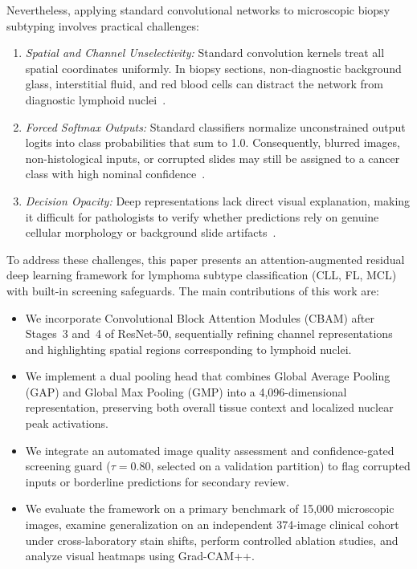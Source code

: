 \documentclass[conference]{IEEEtran}
\begin{document}
Nevertheless, applying standard convolutional networks to microscopic biopsy subtyping involves practical challenges:
\begin{enumerate}
    \item \textit{Spatial and Channel Unselectivity:} Standard convolution kernels treat all spatial coordinates uniformly. In biopsy sections, non-diagnostic background glass, interstitial fluid, and red blood cells can distract the network from diagnostic lymphoid nuclei~\cite{raman2025deep}.
    \item \textit{Forced Softmax Outputs:} Standard classifiers normalize unconstrained output logits into class probabilities that sum to 1.0. Consequently, blurred images, non-histological inputs, or corrupted slides may still be assigned to a cancer class with high nominal confidence~\cite{singh2023enhanced}.
    \item \textit{Decision Opacity:} Deep representations lack direct visual explanation, making it difficult for pathologists to verify whether predictions rely on genuine cellular morphology or background slide artifacts~\cite{alsadi2023enhanced, chattopadhay2018grad}.
\end{enumerate}

To address these challenges, this paper presents an attention-augmented residual deep learning framework for lymphoma subtype classification (CLL, FL, MCL) with built-in screening safeguards. The main contributions of this work are:
\begin{itemize}
    \item We incorporate Convolutional Block Attention Modules (CBAM) after Stages~3 and~4 of ResNet-50, sequentially refining channel representations and highlighting spatial regions corresponding to lymphoid nuclei.
    \item We implement a dual pooling head that combines Global Average Pooling (GAP) and Global Max Pooling (GMP) into a 4,096-dimensional representation, preserving both overall tissue context and localized nuclear peak activations.
    \item We integrate an automated image quality assessment and confidence-gated screening guard ($\tau = 0.80$, selected on a validation partition) to flag corrupted inputs or borderline predictions for secondary review.
    \item We evaluate the framework on a primary benchmark of 15,000 microscopic images, examine generalization on an independent 374-image clinical cohort under cross-laboratory stain shifts, perform controlled ablation studies, and analyze visual heatmaps using Grad-CAM++.
\end{itemize}
\end{document}
